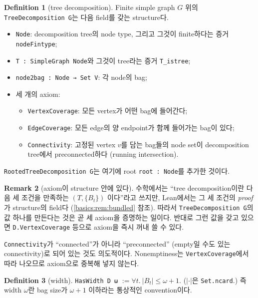 \documentclass[11pt]{article}
\theoremstyle{definition}
\newtheorem{definition}{Definition}[section]
\newtheorem{remark}[definition]{Remark}
\theoremstyle{plain}
\newcommand{\lean}[1]{\texttt{#1}}
\begin{document}
\begin{definition}[tree decomposition]
\label{basics:def:treedecomp}
Finite simple graph $G$ 위의 \lean{TreeDecomposition G}는 다음 field를 갖는
structure다.
\begin{itemize}
  \item \lean{Node}: decomposition tree의 node type, 그리고 그것이 finite하다는
    증거 \lean{nodeFintype};
  \item \lean{T : SimpleGraph Node}와 그것이 tree라는 증거 \lean{T\_istree};
  \item \lean{node2bag : Node → Set V}: 각 node의 bag;
  \item 세 개의 axiom:
  \begin{itemize}
    \item \lean{VertexCoverage}: 모든 vertex가 어떤 bag에 들어간다;
    \item \lean{EdgeCoverage}: 모든 edge의 양 endpoint가 함께 들어가는 bag이
      있다;
    \item \lean{Connectivity}: 고정된 vertex $v$를 담는 bag들의 node set이
      decomposition tree에서 preconnected하다 (running intersection).
  \end{itemize}
\end{itemize}
\lean{RootedTreeDecomposition G}는 여기에 root \lean{root : Node}를 추가한
것이다.
\end{definition}

\begin{remark}[axiom이 structure 안에 있다]
수학에서는 ``tree decomposition이란 다음 세 조건을 만족하는 $(T, \{B_t\})$
이다''라고 쓰지만, Lean에서는 그 세 조건의 \emph{proof}가 structure의 field다
(\ref{basics:rem:bundled} 참조). 따라서 \lean{TreeDecomposition G}의 값
하나를 만든다는 것은 곧 세 axiom을 증명하는 일이다. 반대로 그런 값을 갖고
있으면 \lean{D.VertexCoverage} 등으로 axiom을 즉시 꺼내 쓸 수 있다.

\lean{Connectivity}가 ``connected''가 아니라 ``preconnected'' (empty일 수도
있는 connectivity)로 되어 있는 것도 의도적이다. Nonemptiness는
\lean{VertexCoverage}에서 따라 나오므로 axiom으로 중복해 넣지 않는다.
\end{remark}

\begin{definition}[width]
\label{basics:def:haswidth}
\lean{HasWidth D ω} $:= \forall t.\ |B_t| \le \omega + 1$.
($|\cdot|$은 \lean{Set.ncard}.) 즉 width $\omega$란 bag size가 $\omega+1$
이하라는 통상적인 convention이다.
\end{definition}
\end{document}
